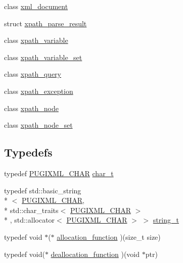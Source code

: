 \begin{DoxyCompactItemize}
\item 
class \hyperlink{classpugi_1_1xml__document}{xml\-\_\-document}
\item 
struct \hyperlink{structpugi_1_1xpath__parse__result}{xpath\-\_\-parse\-\_\-result}
\item 
class \hyperlink{classpugi_1_1xpath__variable}{xpath\-\_\-variable}
\item 
class \hyperlink{classpugi_1_1xpath__variable__set}{xpath\-\_\-variable\-\_\-set}
\item 
class \hyperlink{classpugi_1_1xpath__query}{xpath\-\_\-query}
\item 
class \hyperlink{classpugi_1_1xpath__exception}{xpath\-\_\-exception}
\item 
class \hyperlink{classpugi_1_1xpath__node}{xpath\-\_\-node}
\item 
class \hyperlink{classpugi_1_1xpath__node__set}{xpath\-\_\-node\-\_\-set}
\end{DoxyCompactItemize}
\subsection*{Typedefs}
\begin{DoxyCompactItemize}
\item 
typedef \hyperlink{pugixml_8hpp_af467437c41f223eaed56106370aa82ff}{P\-U\-G\-I\-X\-M\-L\-\_\-\-C\-H\-A\-R} \hyperlink{namespacepugi_aef5a7a62cba0507542220ea15afe39df}{char\-\_\-t}
\item 
typedef std\-::basic\-\_\-string\\*
$<$ \hyperlink{pugixml_8hpp_af467437c41f223eaed56106370aa82ff}{P\-U\-G\-I\-X\-M\-L\-\_\-\-C\-H\-A\-R}, \\*
std\-::char\-\_\-traits$<$ \hyperlink{pugixml_8hpp_af467437c41f223eaed56106370aa82ff}{P\-U\-G\-I\-X\-M\-L\-\_\-\-C\-H\-A\-R} $>$\\*
, std\-::allocator$<$ \hyperlink{pugixml_8hpp_af467437c41f223eaed56106370aa82ff}{P\-U\-G\-I\-X\-M\-L\-\_\-\-C\-H\-A\-R} $>$ $>$ \hyperlink{namespacepugi_a053b39a84c8bb031ff3973d1954a876c}{string\-\_\-t}
\item 
typedef void $\ast$($\ast$ \hyperlink{namespacepugi_a15c8048c4bbfca2ad0ab9fc0b56ea522}{allocation\-\_\-function} )(size\-\_\-t size)
\item 
typedef void($\ast$ \hyperlink{namespacepugi_aa6161e8d6344110788d7ff8a11ca680b}{deallocation\-\_\-function} )(void $\ast$ptr)
\end{DoxyCompactItemize}
